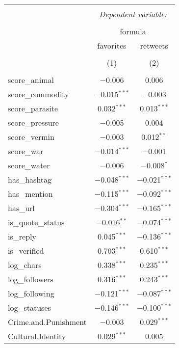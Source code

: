 
\begin{table}[!htbp] \centering 
  \caption{} 
  \label{} 
\begin{tabular}{@{\extracolsep{5pt}}lcc} 
\\[-1.8ex]\hline 
\hline \\[-1.8ex] 
 & \multicolumn{2}{c}{\textit{Dependent variable:}} \\ 
\cline{2-3} 
\\[-1.8ex] & \multicolumn{2}{c}{formula} \\ 
 & favorites & retweets \\ 
\\[-1.8ex] & (1) & (2)\\ 
\hline \\[-1.8ex] 
 score\_animal & $-$0.006 & 0.006 \\ 
  score\_commodity & $-$0.015$^{***}$ & $-$0.003 \\ 
  score\_parasite & 0.032$^{***}$ & 0.013$^{***}$ \\ 
  score\_pressure & $-$0.005 & 0.004 \\ 
  score\_vermin & $-$0.003 & 0.012$^{**}$ \\ 
  score\_war & $-$0.014$^{***}$ & $-$0.001 \\ 
  score\_water & $-$0.006 & $-$0.008$^{*}$ \\ 
  has\_hashtag & $-$0.048$^{***}$ & $-$0.021$^{***}$ \\ 
  has\_mention & $-$0.115$^{***}$ & $-$0.092$^{***}$ \\ 
  has\_url & $-$0.304$^{***}$ & $-$0.165$^{***}$ \\ 
  is\_quote\_status & $-$0.016$^{**}$ & $-$0.074$^{***}$ \\ 
  is\_reply & 0.045$^{***}$ & $-$0.136$^{***}$ \\ 
  is\_verified & 0.703$^{***}$ & 0.610$^{***}$ \\ 
  log\_chars & 0.338$^{***}$ & 0.235$^{***}$ \\ 
  log\_followers & 0.316$^{***}$ & 0.243$^{***}$ \\ 
  log\_following & $-$0.121$^{***}$ & $-$0.087$^{***}$ \\ 
  log\_statuses & $-$0.146$^{***}$ & $-$0.100$^{***}$ \\ 
  Crime.and.Punishment & $-$0.003 & 0.029$^{***}$ \\ 
  Cultural.Identity & 0.029$^{***}$ & 0.005 \\ 

\end{tabular}
\end{table}
